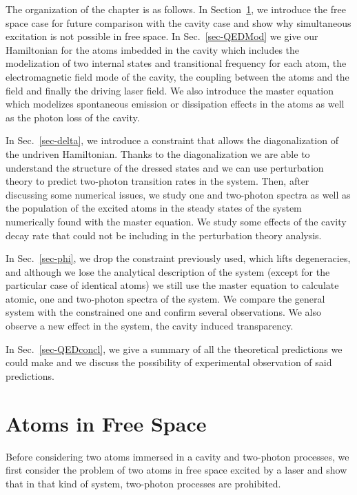 The organization of the chapter is as follows. In Section~\ref{sec-free}, we introduce the free space case for future comparison with the cavity case and show why simultaneous excitation is not possible in free space. In Sec.~\ref{sec-QEDMod} we give our Hamiltonian for the atoms imbedded in the cavity which includes the modelization of  two internal  states and transitional frequency for each atom, the electromagnetic field mode of the cavity, the coupling between the atoms and the field and finally the driving laser field. We also introduce the master equation which modelizes spontaneous emission or dissipation effects in the atoms as well as the photon loss of the cavity.

In Sec.~\ref{sec-delta}, we introduce a constraint that allows the diagonalization of the undriven Hamiltonian. Thanks to the diagonalization we are able to understand the structure of the dressed states and we can use perturbation theory to predict two-photon transition rates in the system. Then, after discussing some numerical issues, we study one and two-photon spectra as well as the population of the excited atoms in the steady states of the system numerically found with the master equation. We study some effects of the cavity decay rate that could not be including in the perturbation theory analysis.

In Sec.~\ref{sec-phi}, we drop the constraint previously used, which lifts degeneracies, and although we lose the analytical description of the system (except for the particular case of identical atoms) we still use the master equation to calculate  atomic, one and two-photon spectra of the system. We compare the general system with the constrained one and confirm several observations. We also observe a new effect in the system, the cavity induced transparency.

In Sec.~\ref{sec-QEDconcl}, we give a summary of all the theoretical predictions we could make and we discuss the possibility of experimental observation of said predictions.

\section{Atoms in Free Space} \label{sec-free}

Before considering two atoms immersed in a cavity and two-photon processes, we first consider the problem of two atoms in free space excited by a laser and show that in that kind of system, two-photon processes are prohibited.

